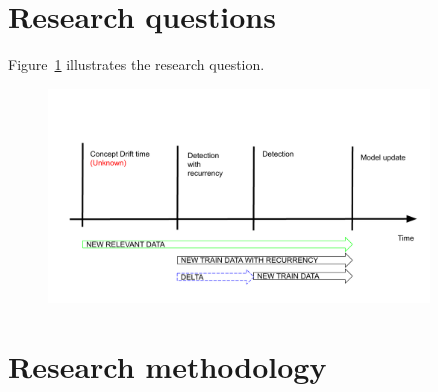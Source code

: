 \section{Research questions}
Figure~\ref{fig:research_question} illustrates the research question.
\begin{figure}[htb!]
	\centering
	\includegraphics[width=0.9\textwidth]{images/google_slides/scheme_cd_recurrency}
  \caption{
	}\label{fig:research_question}
\end{figure}


\section{Research methodology}


